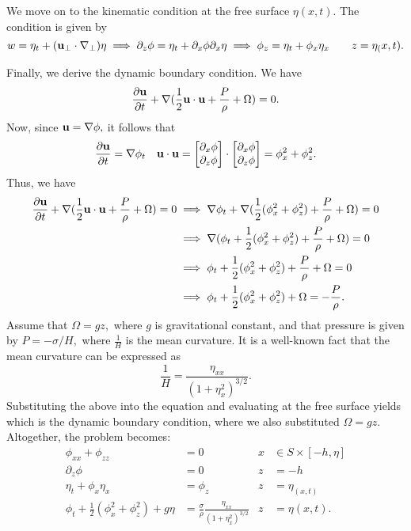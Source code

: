 \documentclass[10pt,reqno,oneside,a4paper]{article}
\begin{document}
We move on to the kinematic condition at the free surface $\eta(x,t).$ The condition is given by 
\begin{equation}\label{EE-kinematic}
w = \eta_t + ({\bf u}_{\perp} \cdot \nabla_{\perp})\eta \implies \partial_z \phi = \eta_t + \partial_x \phi \partial_x \eta \implies \phi_z = \eta_t + \phi_x \eta_x \qquad z = \eta_(x,t).
\end{equation}


Finally, we derive the dynamic boundary condition. We have
\[ \frac{\partial {\bf u}}{\partial t} + \nabla (\frac{1}{2} {\bf u} \cdot {\bf u} + \frac{P}{\rho} + \Omega) = 0. \]
Now, since ${\bf u} = \nabla \phi,$ it follows that 
\[ 
\frac{\partial {\bf u}}{\partial t} = \nabla \phi_t \quad {\bf u} \cdot {\bf u} = \begin{bmatrix} \partial_x \phi \\ \partial_z \phi \end{bmatrix} \cdot \begin{bmatrix} \partial_x \phi \\ \partial_z \phi \end{bmatrix} = \phi_x^2 + \phi_z^2.
\]
Thus, we have 
\begin{align*}
\frac{\partial {\bf u}}{\partial t} + \nabla (\frac{1}{2} {\bf u} \cdot {\bf u} + \frac{P}{\rho} + \Omega) = 0 &\implies \nabla \phi_t  + \nabla (\frac{1}{2} (\phi_x^2 + \phi_z^2) + \frac{P}{\rho} + \Omega) = 0 \\
&\implies \nabla(\phi_t + \frac{1}{2} (\phi_x^2 + \phi_z^2) + \frac{P}{\rho} + \Omega) = 0 \\
&\implies \phi_t + \frac{1}{2} (\phi_x^2 + \phi_z^2) + \frac{P}{\rho} + \Omega = 0 \\
&\implies \phi_t + \frac{1}{2} (\phi_x^2 + \phi_z^2) + \Omega = -  \frac{P}{\rho}.
\end{align*}
Assume that $\Omega = g z,$ where $g$ is gravitational constant, and that pressure is given by $P = -\sigma/H,$ where $\frac{1}{H}$ is the mean curvature. It is a well-known fact that the mean curvature can be expressed as 
\[ 
\frac{1}{H} = \frac{\eta_{xx}}{(1+\eta_x^2)^{3/2}}.
\]
Substituting the above into the equation and evaluating at the free surface yields 
which is the dynamic boundary condition, where we also substituted $\Omega = gz$. Altogether, the problem becomes:
\begin{align*}
\phi_{xx} + \phi_{zz} &= 0 &x &\in S\times [-h, \eta] \\
\partial_z \phi &= 0 &z &= -h \\
\eta_t + \phi_x \eta_x &= \phi_z &z &= \eta_(x,t) \\
\phi_t + \frac{1}{2} (\phi_x^2 + \phi_z^2) + g\eta &= \frac{\sigma}{\rho} \frac{\eta_{xx}}{(1+\eta_x^2)^{3/2}} &z &= \eta(x, t).
\end{align*}
\end{document}
